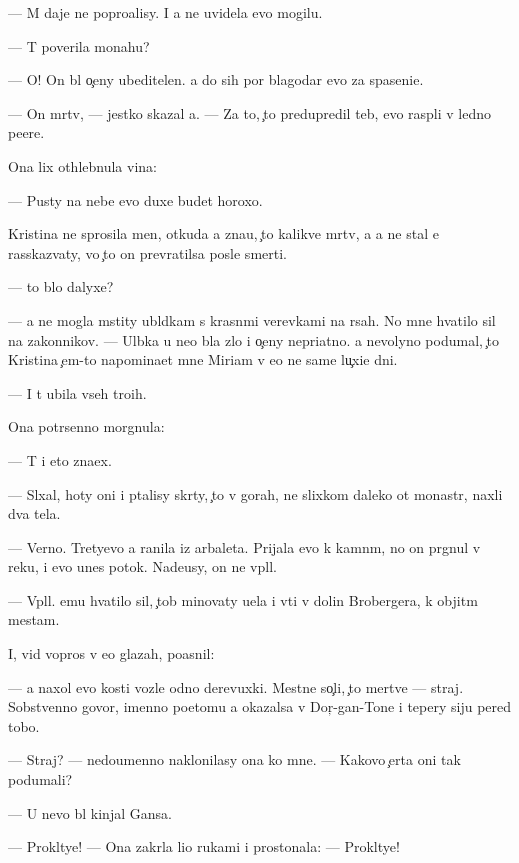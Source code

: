 \documentclass[10pt]{book}
\begin{document}
— M{\yi} daje ne popro{\x}alisy. I {\y}a ne uvidela {\y}evo mogilu.

— T{\yi} poverila monahu?

— O! On b{\yi}l o{\c}eny ubeditelen. {\Y}a do sih por blagodar{\iu} {\y}evo za spaseni{\y}e.

— On m{\e}rtv, — jestko skazal {\y}a. — Za to, {\c}to predupredil teb{\ia}, {\y}evo rasp{\ia}li v led{\ia}no{\y} pe{\x}ere.

Ona lix othlebnula vina:

— Pusty na nebe {\y}evo duxe budet horoxo.

Kristina ne sprosila men{\ia}, otkuda {\y}a zna{\y}u, {\c}to kalikve{\q} m{\e}rtv, a {\y}a ne stal {\y}e{\y} rasskaz{\yi}vaty, vo {\c}to on prevratilsa posle smerti.

— {\C}to b{\yi}lo dalyxe?

— {\Y}a ne mogla mstity ubl{\iu}dkam s krasn{\yi}mi verevkami na r{\ia}sah. No mne hvatilo sil na zakonnikov. — Ul{\yi}bka u ne{\y}o b{\yi}la zlo{\y} i o{\c}eny nepri{\y}atno{\y}. {\Y}a nevolyno podumal, {\c}to Kristina {\c}em-to napomina{\y}et mne Miriam v {\y}e{\y}o ne sam{\yi}{\y}e lu{\c}xi{\y}e dni.

— I t{\yi} ubila vseh tro{\y}ih.

Ona potr{\ia}senno morgnula:

— T{\yi} i eto zna{\y}ex.

— Sl{\yi}xal, hoty oni i p{\yi}talisy skr{\yi}ty, {\c}to v gorah, ne slixkom daleko ot monast{\yi}r{\ia}, naxli dva tela.

— Verno. Tretyevo {\y}a ranila iz arbaleta. Prijala {\y}evo k kamn{\ia}m, no on pr{\yi}gnul v reku, i {\y}evo unes potok. Nade{\y}usy, on ne v{\yi}pl{\yi}l.

— V{\yi}pl{\yi}l. {\Y}emu hvatilo sil, {\c}tob{\yi} minovaty u{\x}el{\y}a i v{\yi}{\y}ti v dolin{\yi} Brobergera, k objit{\yi}m mestam.

I, vid{\ia} vopros v {\y}e{\y}o glazah, po{\y}asnil:

— {\Y}a naxol {\y}evo kosti vozle odno{\y} derevuxki. Mestn{\yi}{\y}e so{\c}li, {\c}to mertve{\q} — straj. Sobstvenno govor{\ia}, imenno poetomu {\y}a okazalsa v Dor{\c}-gan-To{\y}ne i tepery siju pered tobo{\y}.

— Straj? — nedoumenno naklonilasy ona ko mne. — Kakovo {\c}erta oni tak podumali?

— U nevo b{\yi}l kinjal Gansa.

— Prokl{\ia}tye! — Ona zakr{\yi}la li{\q}o rukami i prostonala: — Prokl{\ia}tye!
\end{document}
